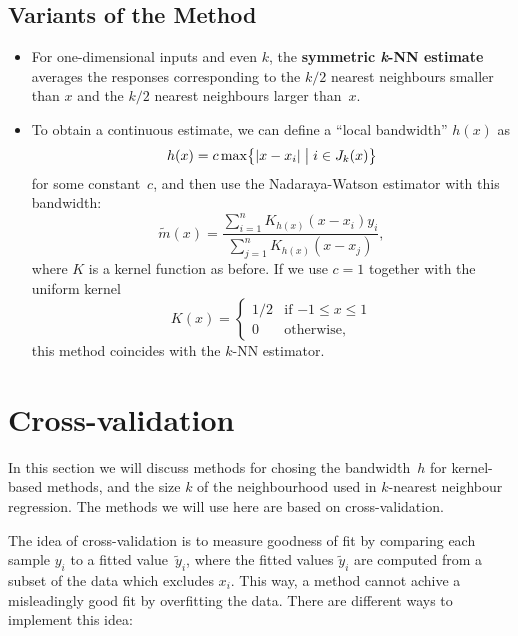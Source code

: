 \documentclass[
  a4paper,
]{article}
\theoremstyle{definition}
\theoremstyle{definition}
\theoremstyle{definition}
\theoremstyle{definition}
\theoremstyle{remark}
\begin{document}
\hypertarget{variants-of-the-method}{%
\subsection{Variants of the Method}\label{variants-of-the-method}}

\begin{itemize}
\item
  For one-dimensional inputs and even \(k\), the \textbf{symmetric \emph{k}-NN
  estimate} averages the responses corresponding to the \(k/2\) nearest
  neighbours smaller than \(x\) and the \(k/2\) nearest neighbours larger
  than~\(x\).
\item
  To obtain a continuous estimate, we can define a ``local bandwidth''
  \(h(x)\) as \begin{equation*}
    h(x) = c \max\bigl\{ |x - x_i| \bigm| i \in J_k(x) \bigr\}
  \end{equation*} for some constant~\(c\), and then use the
  Nadaraya-Watson estimator with this bandwidth: \begin{equation*}
    \tilde m(x)
    = \frac{\sum_{i=1}^n K_{h(x)}(x - x_i) y_i}{\sum_{j=1}^n K_{h(x)}(x - x_j)},
  \end{equation*} where \(K\) is a kernel function as before. If we use
  \(c = 1\) together with the uniform kernel \begin{equation*}
    K(x)
    = \begin{cases}
        1/2 & \mbox{if $-1 \leq x \leq 1$} \\
        0 & \mbox{otherwise,}
      \end{cases}
  \end{equation*} this method coincides with the \(k\)-NN estimator.
\end{itemize}

\clearpage

\hypertarget{X08-xval}{%
\section{Cross-validation}\label{X08-xval}}

In this section we will discuss methods for chosing the bandwidth~\(h\)
for kernel-based methods, and the size \(k\) of the neighbourhood used
in \(k\)-nearest neighbour regression. The methods we will use here
are based on cross-validation.

The idea of cross-validation is to measure goodness of fit by comparing each
sample \(y_i\) to a fitted value~\(\tilde y_i\), where the fitted values \(\tilde y_i\) are computed from a subset of the data which excludes \(x_i\).
This way, a method cannot achive a misleadingly good fit by overfitting the data.
There are different ways to implement this idea:
\end{document}
